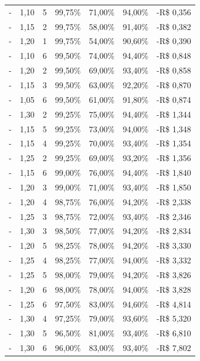 \begin{table}[htbp]
\begin{tabular}{crrrrrr}
        -     & 1,10 & 5  & 99,75\%       & 71,00\%        & 94,00\%  & -R\$ 0,356 \\
        -     & 1,15 & 2  & 99,75\%       & 58,00\%        & 91,40\%  & -R\$ 0,382 \\
        -     & 1,20 & 1  & 99,75\%       & 54,00\%        & 90,60\%  & -R\$ 0,390 \\
        -     & 1,10 & 6  & 99,50\%       & 74,00\%        & 94,40\%  & -R\$ 0,848 \\
        -     & 1,20 & 2  & 99,50\%       & 69,00\%        & 93,40\%  & -R\$ 0,858 \\
        -     & 1,15 & 3  & 99,50\%       & 63,00\%        & 92,20\%  & -R\$ 0,870 \\
        -     & 1,05 & 6  & 99,50\%       & 61,00\%        & 91,80\%  & -R\$ 0,874 \\
        -     & 1,30 & 2  & 99,25\%       & 75,00\%        & 94,40\%  & -R\$ 1,344 \\
        -     & 1,15 & 5  & 99,25\%       & 73,00\%        & 94,00\%  & -R\$ 1,348 \\
        -     & 1,15 & 4  & 99,25\%       & 70,00\%        & 93,40\%  & -R\$ 1,354 \\
        -     & 1,25 & 2  & 99,25\%       & 69,00\%        & 93,20\%  & -R\$ 1,356 \\
        -     & 1,15 & 6  & 99,00\%       & 76,00\%        & 94,40\%  & -R\$ 1,840 \\
        -     & 1,20 & 3  & 99,00\%       & 71,00\%        & 93,40\%  & -R\$ 1,850 \\
        -     & 1,20 & 4  & 98,75\%       & 76,00\%        & 94,20\%  & -R\$ 2,338 \\
        -     & 1,25 & 3  & 98,75\%       & 72,00\%        & 93,40\%  & -R\$ 2,346 \\
        -     & 1,30 & 3  & 98,50\%       & 77,00\%        & 94,20\%  & -R\$ 2,834 \\
        -     & 1,20 & 5  & 98,25\%       & 78,00\%        & 94,20\%  & -R\$ 3,330 \\
        -     & 1,25 & 4  & 98,25\%       & 77,00\%        & 94,00\%  & -R\$ 3,332 \\
        -     & 1,25 & 5  & 98,00\%       & 79,00\%        & 94,20\%  & -R\$ 3,826 \\
        -     & 1,20 & 6  & 98,00\%       & 78,00\%        & 94,00\%  & -R\$ 3,828 \\
        -     & 1,25 & 6  & 97,50\%       & 83,00\%        & 94,60\%  & -R\$ 4,814 \\
        -     & 1,30 & 4  & 97,25\%       & 79,00\%        & 93,60\%  & -R\$ 5,320 \\
        -     & 1,30 & 5  & 96,50\%       & 81,00\%        & 93,40\%  & -R\$ 6,810 \\
        -     & 1,30 & 6  & 96,00\%       & 83,00\%        & 93,40\%  & -R\$ 7,802 \\
        \hline\hline
    \end{tabular}
\end{table}

